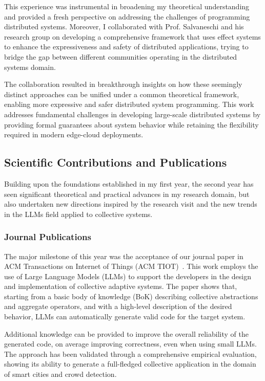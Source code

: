 \documentclass[runningheads]{llncs}
\begin{document}
This experience was instrumental in broadening my theoretical understanding and provided a fresh perspective on addressing the challenges of programming distributed systems.
%
Moreover,
I collaborated with Prof. Salvaneschi and his research group on developing a comprehensive framework that uses effect systems to enhance the expressiveness and safety of distributed applications,
trying to bridge the gap between different communities operating in the distributed systems domain.

The collaboration resulted in breakthrough insights on how these seemingly distinct approaches can be unified under a common theoretical framework,
enabling more expressive and safer distributed system programming.
%
This work addresses fundamental challenges in developing large-scale distributed systems by providing formal guarantees about system behavior while retaining the flexibility required in modern edge-cloud deployments.

\subsection{Scientific Contributions and Publications}
Building upon the foundations established in my first year,
the second year has seen significant theoretical and practical advances in my research domain,
but also undertaken new directions inspired by the research visit and the new trends in the LLMs field applied to collective systems.

\subsubsection{Journal Publications}
The major milestone of this year was the acceptance of our journal paper in ACM Transactions on Internet of Things (ACM TIOT)~\cite{10.1145/3758326}.
%
This work employs the use of Large Language Models (LLMs) to support the developers in the design and implementation of collective adaptive systems.
%
The paper shows that, starting from a basic body of knowledge (BoK) describing collective abstractions and aggregate operators,
and with a high-level description of the desired behavior,
LLMs can automatically generate valid code for the target system.

Additional knowledge can be provided to improve the overall reliability of the generated code,
on average improving correctness,
even when using small LLMs.
%
The approach has been validated through a comprehensive empirical evaluation,
showing its ability to generate a full-fledged collective application in the domain of smart cities and crowd detection.
\end{document}
